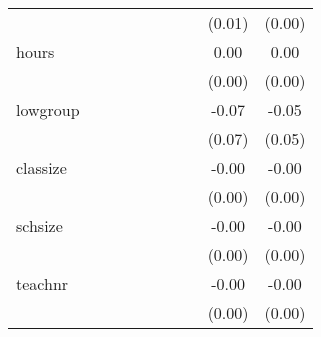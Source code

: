 \documentclass{article}
\begin{document}
{\begin{tabular}{l*{9}{c}}
            &                     &                     &                     &                     &                     &                     &                     &      (0.01)         &      (0.00)         \\
[1em]
hours       &                     &                     &                     &                     &                     &                     &                     &        0.00         &        0.00         \\
            &                     &                     &                     &                     &                     &                     &                     &      (0.00)         &      (0.00)         \\
[1em]
lowgroup    &                     &                     &                     &                     &                     &                     &                     &       -0.07         &       -0.05         \\
            &                     &                     &                     &                     &                     &                     &                     &      (0.07)         &      (0.05)         \\
[1em]
classize    &                     &                     &                     &                     &                     &                     &                     &       -0.00         &       -0.00         \\
            &                     &                     &                     &                     &                     &                     &                     &      (0.00)         &      (0.00)         \\
[1em]
schsize     &                     &                     &                     &                     &                     &                     &                     &       -0.00         &       -0.00         \\
            &                     &                     &                     &                     &                     &                     &                     &      (0.00)         &      (0.00)         \\
[1em]
teachnr     &                     &                     &                     &                     &                     &                     &                     &       -0.00         &       -0.00         \\
            &                     &                     &                     &                     &                     &                     &                     &      (0.00)         &      (0.00)         \\

\end{tabular}}
\end{document}
